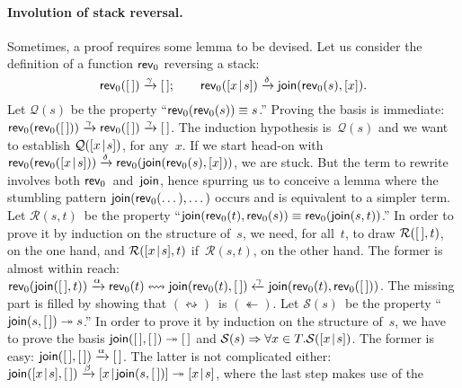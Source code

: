 \medskip

\paragraph{Involution of stack reversal.}

Sometimes, a proof requires some lemma to be devised. Let us consider
the definition of a function \(\textsf{rev}_0\) reversing a stack:
\begin{equation*}
\textsf{rev}_0([\,]) \xrightarrow{\smash{\gamma}} [\,];\qquad
\textsf{rev}_0([{x}\!\mid\!{s}])
                 \xrightarrow{\smash{\delta}} \textsf{join}(\textsf{rev}_0(s),[x]).
\end{equation*}
Let \(\mathcal{Q}(s)\) be the property ``\(\textsf{rev}_0(\textsf{rev}_0(s))
\equiv s\).'' Proving the basis is immediate:
\(\textsf{rev}_0(\textsf{rev}_0([\,])) \xrightarrow{\smash{\gamma}}
\textsf{rev}_0([\,]) \xrightarrow{\smash{\gamma}} [\,]\). The induction
hypothesis is~\(\mathcal{Q}(s)\) and we want to establish
\(\mathcal{Q}([{x}\!\mid\!{s}])\), for any~\(x\). If we start head\hyp{}on
with \(\textsf{rev}_0(\textsf{rev}_0([{x}\!\mid\!{s}]))
\xrightarrow{\smash{\delta}}
\textsf{rev}_0(\textsf{join}(\textsf{rev}_0(s),[x]))\), we are stuck. But the
term to rewrite involves both \(\textsf{rev}_0\)~and~\(\textsf{join}\),
hence spurring us to conceive a lemma where the stumbling pattern
\(\textsf{join}(\textsf{rev}_0(\dots),\dots)\) occurs and is equivalent to a
simpler term. Let \(\mathcal{R}(s,t)\)~be the property
``\(\textsf{join}(\textsf{rev}_0(t),\textsf{rev}_0(s)) \equiv
\textsf{rev}_0(\textsf{join}(s,t))\).'' In order to prove it by induction on
the structure of~\(s\), we need, for all~\(t\), to draw
\(\mathcal{R}([\,],t)\), on the one hand, and
\(\mathcal{R}([{x}\!\mid\!{s}],t)\) if~\(\mathcal{R}(s,t)\), on the other
hand. The former is almost within reach:
\(\textsf{rev}_0(\textsf{join}([\,],t)) \xrightarrow{\smash{\alpha}}
\textsf{rev}_0(t) \leftrightsquigarrow \textsf{join}(\textsf{rev}_0(t),[\,])
\xleftarrow{\smash{\gamma}}
\textsf{join}(\textsf{rev}_0(t),\textsf{rev}_0([\,]))\). The missing part is
filled by showing that \((\leftrightsquigarrow)\)~is
\((\twoheadleftarrow)\). Let \(\mathcal{S}(s)\)~be the property
``\(\textsf{join}(s,[\,]) \twoheadrightarrow s\).'' In order to prove it
by induction on the structure of~\(s\), we have to prove the basis
\(\textsf{join}([\,],[\,]) \twoheadrightarrow [\,]\) and \(\mathcal{S}(s)
\Rightarrow \forall x \in T.\mathcal{S}([{x}\!\mid\!{s}])\). The former is
easy: \(\textsf{join}([\,],[\,]) \xrightarrow{\smash{\alpha}} [\,]\). The
latter is not complicated either: \(\textsf{join}([{x}\!\mid\!{s}],[\,])
\xrightarrow{\smash{\beta}} [{x}\!\mid\!{\textsf{join}(s,[\,])}]
\twoheadrightarrow [{x}\!\mid\!{s}]\), where the last step makes use of the
